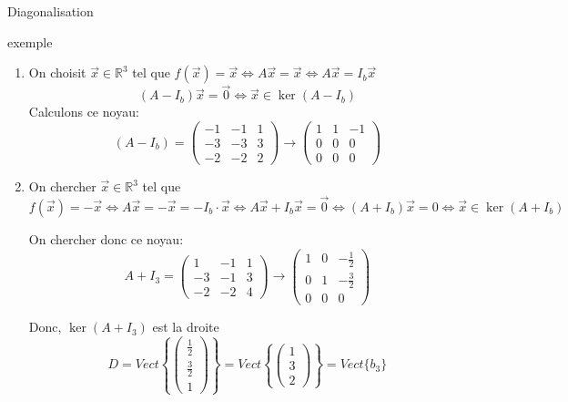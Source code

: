 \begin{parag}{Diagonalisation}
\begin{subparag}{exemple}
    \begin{enumerate}
        \item On choisit $\vec{x} \in \mathbb{R}^3$ tel que $f(\vec{x}) = \vec{x} \Leftrightarrow A\vec{x} = \vec{x} \Leftrightarrow A\vec{x} = I_b \vec{x}$
        \\
        \[(A - I_b)\vec{x} = \vec{0} \Leftrightarrow \vec{x} \in \ker (A - I_b)\]
        Calculons ce noyau:
        \[(A - I_b) = \begin{pmatrix}
            -1 & -1 & 1 \\
            -3  & -3 & 3 \\
            -2  & -2 & 2
        \end{pmatrix} \to \begin{pmatrix}
            1 & 1 & -1 \\
            0 & 0 & 0 \\
            0 & 0 & 0 
        \end{pmatrix}\]
    \item On chercher $\vec{x} \in \mathbb{R}^3$ tel que $f(\vec{x}) = -\vec{x} \Leftrightarrow A\vec{x} = -\vec{x} = -I_b\cdot\vec{x} \Leftrightarrow A\vec{x} + I_b\vec{x} = \vec{0} \Leftrightarrow (A + I_b)\vec{x} = 0 \Leftrightarrow \vec{x} \in \ker (A + I_b)$

    On chercher donc ce noyau:
\[A + I_3 = \begin{pmatrix}
    1 & -1 & 1\\
    -3 & -1 & 3\\
    -2 & -2 & 4
\end{pmatrix} \to \begin{pmatrix}
    1 & 0 & -\frac{1}{2}\\
    0 & 1 & -\frac{3}{2}\\
    0 & 0 & 0
\end{pmatrix}\]

Donc, $\ker(A + I_3)$ est la droite \\
\[D = Vect\left\{ \begin{pmatrix}
    \frac{1}{2}\\ \frac{3}{2} \\ 1
\end{pmatrix}\right\} =  Vect \left\{\begin{pmatrix}
    1 \\ 3 \\ 2
\end{pmatrix}\right\} = Vect \{b_3\}\]


\end{enumerate}
\end{subparag}
\end{parag}
